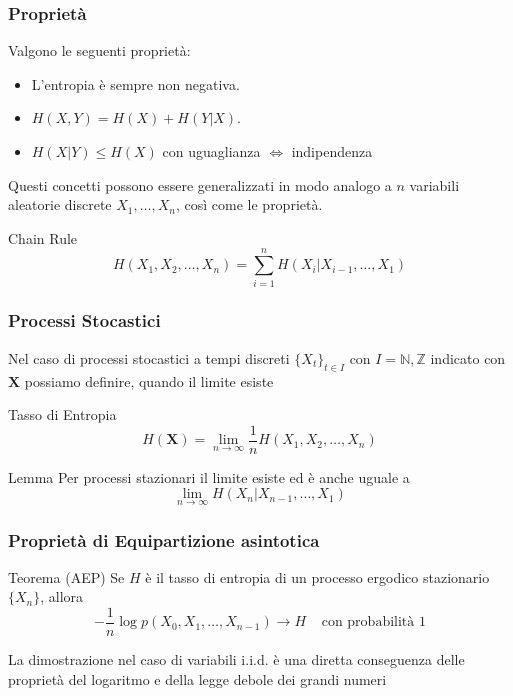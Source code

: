 \documentclass{beamer}
\theoremstyle{plain}
\theoremstyle{definition}
\theoremstyle{remark}
\newcommand{\Z}{\mathbb{Z}}
\newcommand{\N}{\mathbb{N}}
\newcommand{\X}{\bm{X}}
\begin{document}
\begin{frame}
\frametitle{Proprietà}
\begin{block}{}
Valgono le seguenti proprietà:
\begin{itemize}
	\item L'entropia è sempre non negativa.
	\item $H(X,Y)=H(X)+H(Y|X)$.
	\item $H(X|Y)\leq H(X)$ con uguaglianza $\iff$ indipendenza
\end{itemize}
\end{block}
Questi concetti possono essere generalizzati in modo analogo a $n$ variabili aleatorie discrete $X_1,\ldots,X_n$, così come le proprietà.
\begin{block}{Chain Rule}
\begin{equation*}
H(X_1,X_2,\ldots,X_n) = \sum_{i = 1}^{n}{H(X_i|X_{i-1},\ldots,X_1)}
\end{equation*}
\end{block}
\end{frame}


\begin{frame}
\frametitle{Processi Stocastici}
Nel caso di processi stocastici a tempi discreti $\{X_t\}_{t\in I}$ con $I=\N, \Z$ indicato con $\X$ possiamo definire, quando il limite esiste
\begin{block}{Tasso di Entropia}
\begin{equation*}
H(\X) = \lim\limits_{n\to \infty}\frac{1}{n}H(X_1,X_2,\ldots, X_n)
\end{equation*}
\end{block}
\begin{block}{Lemma}
Per processi stazionari il limite esiste ed è anche uguale a
\begin{equation*}
\lim\limits_{n\to \infty}H(X_n|X_{n-1},\ldots, X_1)
\end{equation*}
\end{block}
\end{frame}

\begin{frame}
\frametitle{Proprietà di Equipartizione asintotica}
\begin{block}{Teorema (AEP)}
Se $H$ è il tasso di entropia di un processo ergodico stazionario $\{X_n\}$, allora
\begin{equation*}
-\frac{1}{n}\log p(X_0,X_1,\ldots,X_{n-1})\rightarrow H \;\;\;\; \text{con probabilità } 1
\end{equation*}
\end{block}
La dimostrazione nel caso di variabili i.i.d. è una diretta conseguenza delle proprietà del logaritmo e della legge debole dei grandi numeri
\end{frame}
\end{document}
